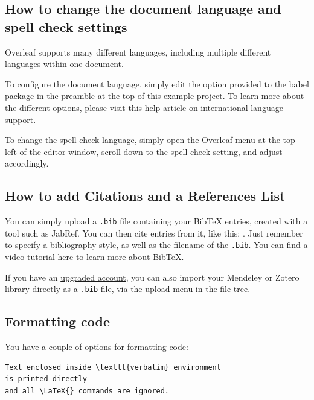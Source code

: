 \documentclass{article}
\begin{document}
\subsection{How to change the document language and spell check settings}

Overleaf supports many different languages, including multiple different languages within one document. 

To configure the document language, simply edit the option provided to the babel package in the preamble at the top of this example project. To learn more about the different options, please visit this help article on \href{https://www.overleaf.com/learn/latex/International_language_support}{international language support}.

To change the spell check language, simply open the Overleaf menu at the top left of the editor window, scroll down to the spell check setting, and adjust accordingly.

\subsection{How to add Citations and a References List}

You can simply upload a \verb|.bib| file containing your BibTeX entries, created with a tool such as JabRef. You can then cite entries from it, like this: \cite{greenwade93}. Just remember to specify a bibliography style, as well as the filename of the \verb|.bib|. You can find a \href{https://www.overleaf.com/help/97-how-to-include-a-bibliography-using-bibtex}{video tutorial here} to learn more about BibTeX.

If you have an \href{https://www.overleaf.com/user/subscription/plans}{upgraded account}, you can also import your Mendeley or Zotero library directly as a \verb|.bib| file, via the upload menu in the file-tree.

\subsection{Formatting code}
You have a couple of options for formatting code:
\begin{verbatim}
Text enclosed inside \texttt{verbatim} environment 
is printed directly 
and all \LaTeX{} commands are ignored.
\end{verbatim}
\end{document}
